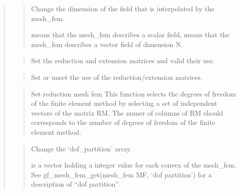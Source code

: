 \documentclass[a4paper,11pt,english]{sphinxmanual}
\begin{document}
\begin{quote}
\begin{quote}

Change the  dimension of the field that is interpolated by the mesh\_fem.

 means that the mesh\_fem describes a scalar field,  means
that the mesh\_fem describes a vector field of dimension N.
\end{quote}

\begin{quote}

Set the reduction and extension matrices and valid their use.
\end{quote}

\begin{quote}

Set or unset the use of the reduction/extension matrices.
\end{quote}

\begin{quote}

Set reduction mesh fem
This function selects the degrees of freedom of the finite element
method by selecting a set of independent vectors of the matrix RM.
The numer of columns of RM should corresponds to the number of degrees
of freedom of the finite element method.
\end{quote}

\begin{quote}

Change the ‘dof\_partition’ array.

 is a vector holding a integer value for each convex of the mesh\_fem.
See gf\_mesh\_fem\_get(mesh\_fem MF, ‘dof partition’) for a description of “dof partition”.
\end{quote}

\begin{quote}


\end{quote}
\end{quote}
\end{document}
